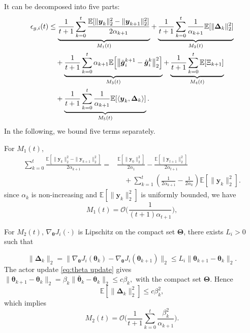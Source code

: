 \documentclass{IEEEtran}
\begin{document}
It can be decomposed into five parts: 
\begin{align}
 \epsilon_{g,i}(t)
 &\le
 \underbrace{\frac{1}{t+1}\sum_{k=0}^{t}\frac{\mathbb{E}[\|\boldsymbol{y}_k\|_2^2-\|\boldsymbol{y}_{k+1}\|_2^2]}{2\alpha_{k+1}}}_{M_1(t)}
 +\underbrace{\frac{1}{t+1}\sum_{k=0}^{t}\frac{1}{\alpha_{k+1}}\mathbb{E}[\|\boldsymbol{\Delta}_k\|_2^2]}_{M_2(t)} \notag\\
 &\quad +\underbrace{\frac{1}{t+1}\sum_{k=0}^{t}\alpha_{k+1}\mathbb{E}\Big[\big\|\tilde{\boldsymbol{g}}_i^{k+1}-\hat{\boldsymbol{g}}_i^k\big\|_2^2\Big]}_{M_3(t)}
 +\underbrace{\frac{1}{t+1}\sum_{k=0}^{t}\mathbb{E}[\Xi_{k+1}]}_{M_4(t)} \notag\\
 &\quad +\underbrace{\frac{1}{t+1}\sum_{k=0}^{t}\frac{1}{\alpha_{k+1}}\mathbb{E}[\langle \boldsymbol{y}_k,\boldsymbol{\Delta}_k\rangle]}_{M_5(t)}.
\label{eq:appD_gradient_decomp}
\end{align}
In the following, we bound five terms separately. 

For $M_1(t)$, 
\begin{equation}
\begin{aligned}
\sum_{k=0}^{t}
\frac{\mathbb{E}[\|\boldsymbol{y}_k\|_2^2-\|\boldsymbol{y}_{k+1}\|_2^2]}
{2\alpha_{k+1}}
={}& \frac{\mathbb{E}[\|\boldsymbol{y}_0\|_2^2]}{2\alpha_1}
-\frac{\mathbb{E}[\|\boldsymbol{y}_{t+1}\|_2^2]}{2\alpha_{t+1}} \\
&\quad +\sum_{k=1}^{t}\left(
\frac{1}{2\alpha_{k+1}}-\frac{1}{2\alpha_k}\right)
\mathbb{E}[\|\boldsymbol{y}_k\|_2^2].
\end{aligned}
\end{equation}
since $\alpha_k$ is non-increasing and $\mathbb{E}[\|\boldsymbol{y}_k\|_2^2]$ is uniformly bounded, we have
\begin{equation}
 M_1(t)=\mathcal{O}\!\Big(\frac{1}{(t+1)\alpha_{t+1}}\Big),
\label{eq:appD_M1_bound}
\end{equation}

For $M_2(t)$, $\nabla_{\boldsymbol{\theta}}J_i(\cdot)$ is Lipschitz on the compact set $\boldsymbol{\Theta}$, there exists $L_i>0$ such that

\begin{equation}
\|\boldsymbol{\Delta}_k\|_2
=\big\|\nabla_{\boldsymbol{\theta}}J_i(\boldsymbol{\theta}_k)-\nabla_{\boldsymbol{\theta}}J_i(\boldsymbol{\theta}_{k+1})\big\|_2
\le L_i\|\boldsymbol{\theta}_{k+1}-\boldsymbol{\theta}_k\|_2.
\end{equation}
The actor update \eqref{eq:theta update} gives
$
\|\boldsymbol{\theta}_{k+1}-\boldsymbol{\theta}_k\|_2
=\beta_k\|\bar{\boldsymbol{\theta}}_k-\boldsymbol{\theta}_k\|_2
\le c\beta_k,
$
with the compact set $\boldsymbol{\Theta}$. Hence
\begin{equation}
\mathbb{E}[\|\boldsymbol{\Delta}_k\|_2^2]\le c\beta_k^2,
\end{equation}
which implies
\begin{equation}
M_2(t)=\mathcal{O}\!\Bigg(\frac{1}{t+1}\sum_{k=0}^{t}\frac{\beta_k^2}{\alpha_{k+1}}\Bigg).
\label{eq:appD_M2_bound}
\end{equation}
\end{document}
